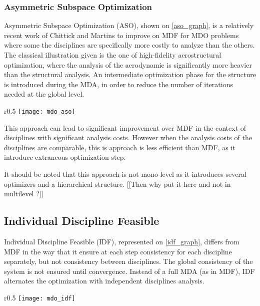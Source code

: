 \subsubsection{Asymmetric Subspace Optimization}

Asymmetric Subspace Optimization (ASO), shown on \figurename{} \ref{aso_graph}, is a relatively recent work of Chittick and Martins\cite{Chittick:2007:B} to improve on MDF for MDO problems where some the disciplines are specifically more costly to analyze than the others. The classical illustration given is the one of high-fidelity aerostructural optimization, where the analysis of the aerodynamic is significantly more heavier than the structural analysis. An intermediate optimization phase for the structure is introduced during the MDA, in order to reduce the number of iterations needed at the global level.

\begin{wrapfigure}{r}{0.5\textwidth}
\centering
\texttt{[image: mdo\_aso]}
\caption{ASO method}\label{aso_graph}
\end{wrapfigure}

This approach can lead to significant improvement over MDF in the context of disciplines with significant analysis costs. However when the analysis costs of the disciplines are comparable, this is approach is less efficient than MDF, as it introduce extraneous optimization step.

It should be noted that this approach is not mono-level as it introduces several optimizers and a hierarchical structure. [[Then why put it here and not in multilevel ?]] 

\subsection{Individual Discipline Feasible}

Individual Discipline Feasible (IDF), represented on \figurename{} \ref{idf_graph}, differs from MDF in the way that it ensure at each step consistency for each discipline separately, but not consistency between disciplines. The global consistency of the system is not ensured until convergence.
Instead of a full MDA (as in MDF), IDF alternates the optimization with independent disciplines analysis.

\begin{wrapfigure}{r}{0.5\textwidth}
\centering
\texttt{[image: mdo\_idf]}
\caption{IDF method}\label{idf_graph}
\end{wrapfigure}

